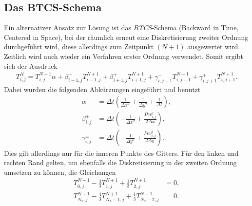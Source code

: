 \documentclass[12pt,a4paper,titlepage,headinclude,bibtotoc]{scrartcl}
\begin{document}
\subsection{Das BTCS-Schema}
\label{sec:btcs}
Ein alternativer Ansatz zur Lösung ist das \textit{BTCS}-Schema (Backward in Time, Centered in Space), bei der räumlich erneut eine Diskretisierung zweiter Ordnung durchgeführt wird, diese allerdings zum Zeitpunkt $(N+1)$ ausgewertet wird. Zeitlich wird auch wieder ein Verfahren erster Ordnung verwendet.
Somit ergibt sich der Ausdruck
\begin{align}
\label{eq:impli}
T_{i,j}^{N} = T_{i,j}^{N+1} \alpha + \beta^-_{i-1,j} T_{i-1,j}^{N+1} + \beta^+_{i+1,j} T_{i+1,j}^{N+1} + \gamma^-_{i,j-1} T_{i,j-1}^{N+1} + \gamma^+_{i,j+1} T_{i,j+1}^{N+1}.
\end{align}
Dabei wurden die folgenden Abkürzungen eingeführt und benutzt
\begin{align*}
\alpha &= \Delta t \left(\frac{1}{\Delta x^2} + \frac{1}{\Delta y^2} + \frac{1}{\Delta t} \right), \\
\beta^\pm_{i,j} &= \Delta t \left(-\frac{1}{\Delta x^2} \pm \frac{Pe v^x_{i,j}}{2 \Delta x}\right), \\
\gamma^\pm_{i,j} &= \Delta t \left(-\frac{1}{\Delta y^2} \pm \frac{Pe v^y_{i,j}}{2 \Delta y}\right).
\end{align*}
Dies gilt allerdings nur für die inneren Punkte des Gitters. Für den linken und rechten Rand gelten, um ebenfalls die Diskretisierung in der zweiten Ordnung umsetzen zu können, die Gleichungen
\begin{align}
\label{eq:impli_neumann}
T^{N+1}_{0,j} - \frac{4}{3} T^{N+1}_{1,j} + \frac{1}{3} T^{N+1}_{2,j} &= 0, \\
T^{N+1}_{N_x,j} - \frac{4}{3} T^{N+1}_{N_x-1,j} + \frac{1}{3} T^{N+1}_{N_x-2,j} &= 0. \\
\end{align}
\end{document}
